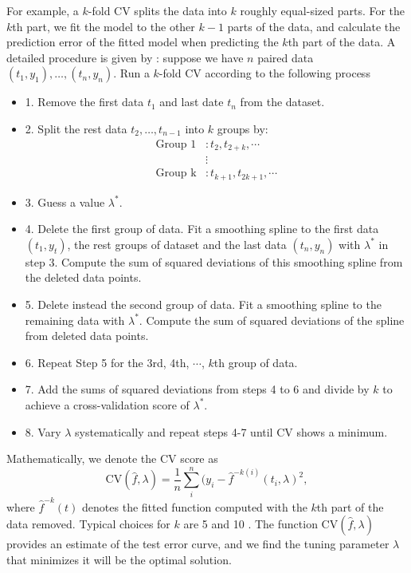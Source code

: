 For example, a $k$-fold CV splits the data into $k$ roughly equal-sized parts. For the $k$th part, we fit the model to the other $k-1$ parts
of the data, and calculate the prediction error of the fitted model when
predicting the $k$th part of the data. A detailed procedure is given by \cite{wahba1975completely}: suppose we have $n$ paired data $(t_1,y_1), \ldots, (t_n,y_n)$. Run a $k$-fold CV according to the following process 
\begin{itemize}
\item 1. Remove the first data $t_1$ and last date $t_n$ from the dataset.
\item 2. Split the rest data $t_2,\ldots,t_{n-1}$ into $k$ groups by:
\begin{align*}
\mbox{Group 1} &: t_2, t_{2+k}, \cdots \\
& \vdots \\
 \mbox{Group k} &: t_{k+1}, t_{2k+1}, \cdots
\end{align*}
\item 3. Guess a value $\lambda^*$. 
\item 4. Delete the first group of data. Fit a smoothing spline to the first data $(t_1,y_t)$, the rest groups of dataset and the last data $(t_n,y_n)$ with $\lambda^*$ in step 3. Compute the sum of squared deviations of this smoothing spline from the deleted data points. 
\item 5. Delete instead the second group of data. Fit a smoothing spline to the remaining data with  $\lambda^*$. Compute the sum of squared deviations of the spline from deleted data points.
\item 6. Repeat Step 5 for the 3rd, 4th, $\cdots$, $k$th group of data.
\item 7. Add the sums of squared deviations from steps 4 to 6 and divide by $k$ to achieve a cross-validation score of $\lambda^*$.
\item 8. Vary  $\lambda$ systematically and repeat steps 4-7 until CV shows a minimum.
\end{itemize}
Mathematically, we denote the CV score as 
\begin{equation*}
\mbox{CV}(\hat{f},\lambda) = \frac{1}{n}\sum_i^n (y_i -\hat{f}^{-k(i)}(t_i,\lambda)^2,
\end{equation*}
where $\hat{f}^{-k}(t)$ denotes the fitted function computed with the $k$th part of the data removed. Typical choices for $k$ are 5 and 10 \cite{esl2009}.  The function $\mbox{CV}(\hat{f},\lambda)$ provides an estimate of the test error curve, and we find the tuning parameter $\lambda$ that minimizes it will be the optimal solution. 

